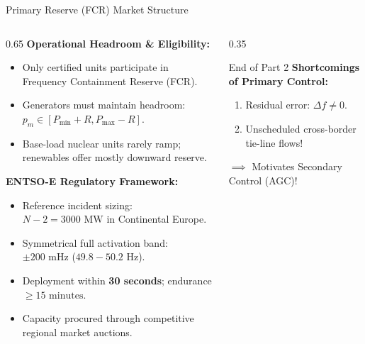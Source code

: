 \begin{frame}{Primary Reserve (FCR) Market Structure}
\begin{columns}[T]
\begin{column}{0.65\textwidth}
    \scriptsize
    \textbf{Operational Headroom \& Eligibility:}
    \begin{itemize}\setlength{\itemsep}{2pt}
        \item Only certified units participate in Frequency Containment Reserve (FCR).
        \item Generators must maintain headroom: $p_m \in [P_{\min} + R, P_{\max} - R]$.
        \item Base-load nuclear units rarely ramp; renewables offer mostly downward reserve.
    \end{itemize}
    \vspace{0.1cm}
    \textbf{ENTSO-E Regulatory Framework:}
    \begin{itemize}\setlength{\itemsep}{2pt}
        \item Reference incident sizing: $N-2 = 3000\text{ MW}$ in Continental Europe.
        \item Symmetrical full activation band: $\pm 200\text{ mHz}$ ($49.8 - 50.2\text{ Hz}$).
        \item Deployment within \textbf{30 seconds}; endurance $\ge 15\text{ minutes}$.
        \item Capacity procured through competitive regional market auctions.
    \end{itemize}
\end{column}
\begin{column}{0.35\textwidth}
    \begin{block}{End of Part 2}
    \scriptsize
    \textbf{Shortcomings of Primary Control:}
    \begin{enumerate}\setlength{\itemsep}{1pt}
        \item Residual error: $\Delta f \neq 0$.
        \item Unscheduled cross-border tie-line flows!
    \end{enumerate}
    $\implies$ Motivates Secondary Control (AGC)!
    \end{block}
\end{column}
\end{columns}
\end{frame}

